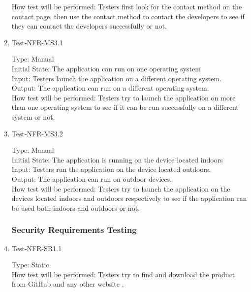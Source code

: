 \documentclass[12pt, titlepage]{article}
\begin{document}
\begin{enumerate}
How test will be performed: Testers first look for the contact method on the contact page, then use the contact method to contact the developers to see if they can contact the developers successfully or not.  

\item{Test-NFR-MS3.1\\}

Type: Manual\\

Initial State: The application can run on one operating system\\

Input: Testers launch the application on a different operating system.\\

Output: The application can run on a different operating system.\\

How test will be performed: Testers try to launch the application on more than one operating system to see if it can be run successfully on a different system or not.  

\item{Test-NFR-MS3.2\\}

Type: Manual\\

Initial State: The application is running on the device located indoors\\

Input: Testers run the application on the device located outdoors.\\

Output: The application can run on outdoor devices.\\

How test will be performed: Testers try to launch the application on the devices located indoors and outdoors respectively to see if the application can be used both indoors and outdoors or not.  


\subsubsection{Security Requirements Testing}

\item{Test-NFR-SR1.1\\}

Type: Static.\\

How test will be performed: Testers try to find and download the product from GitHub and any other website .\\


\end{enumerate}
\end{document}
